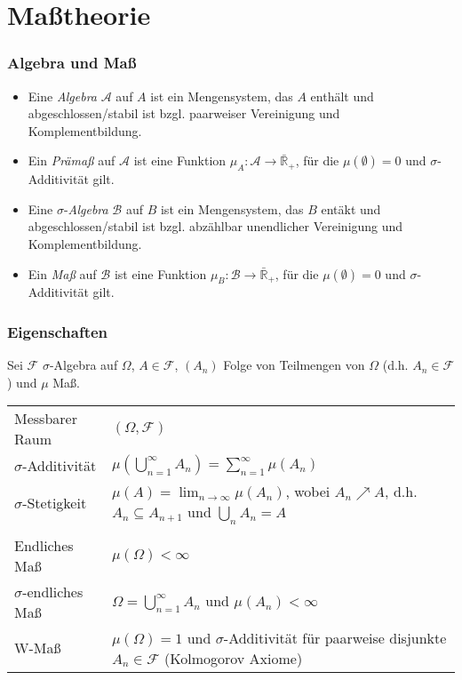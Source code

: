 \documentclass{article}
\begin{document}
\section{Maßtheorie}

\subsubsection*{Algebra und Maß}

\begin{itemize}
\item Eine \emph{Algebra} $\mathcal{A}$ auf $A$ ist ein Mengensystem, das $A$ enthält und abgeschlossen/stabil ist bzgl. paarweiser Vereinigung und Komplementbildung.
\item Ein \emph{Prämaß} auf $\mathcal{A}$ ist eine Funktion $\mu_A : \mathcal{A} \to \mathbb{\bar{R}_+}$, für die $\mu(\emptyset) = 0$ und $\sigma$-Additivität gilt.
\item Eine $\sigma$-\emph{Algebra} $\mathcal{B}$ auf $B$ ist ein Mengensystem, das $B$ entäkt und abgeschlossen/stabil ist bzgl. abzählbar unendlicher Vereinigung und Komplementbildung.
\item Ein \emph{Maß} auf $\mathcal{B}$ ist eine Funktion $\mu_B : \mathcal{B} \to \mathbb{\bar{R}_+}$, für die $\mu(\emptyset) = 0$ und $\sigma$-Additivität gilt.
\end{itemize}

\subsubsection*{Eigenschaften}

Sei $\mathcal{F}$ $\sigma$-Algebra auf $\Omega$, $A \in \mathcal{F}$, $(A_n)$ Folge von Teilmengen von $\Omega$ (d.h. $A_n \in \mathcal{F}$) und $\mu$ Maß.

\begin{tabular}{ll}
Messbarer Raum & $(\Omega, \mathcal{F})$ \\
$\sigma$-Additivität & $\mu(\bigcup_{n=1}^\infty A_n) = \sum_{n=1}^\infty \mu(A_n)$ \\
$\sigma$-Stetigkeit & $\mu(A) = \lim_{n \to \infty} \mu(A_n)$, wobei $A_n \nearrow A$, d.h. $A_n \subseteq A_{n+1}$ und $\bigcup_n A_n = A$ \\
& \\
Endliches Maß & $\mu(\Omega) < \infty$ \\
$\sigma$-endliches Maß & $\Omega = \bigcup_{n=1}^\infty A_n$ und $\mu(A_n) < \infty$ \\
W-Maß & $\mu(\Omega) = 1$ und $\sigma$-Additivität für paarweise disjunkte $A_n \in \mathcal{F}$ (Kolmogorov Axiome) \\
\end{tabular}
\end{document}
